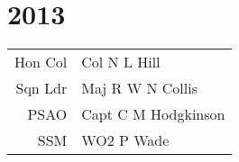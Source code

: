 \chapter*{2013}

\vspace*{20mm}

\begin{center}
  \begin{tabular}{rl}
    Hon Col & Col N L Hill \\
    Sqn Ldr & Maj R W N Collis \\
    PSAO & Capt C M Hodgkinson \\
    SSM & WO2 P Wade \\
  \end{tabular}
\end{center}
